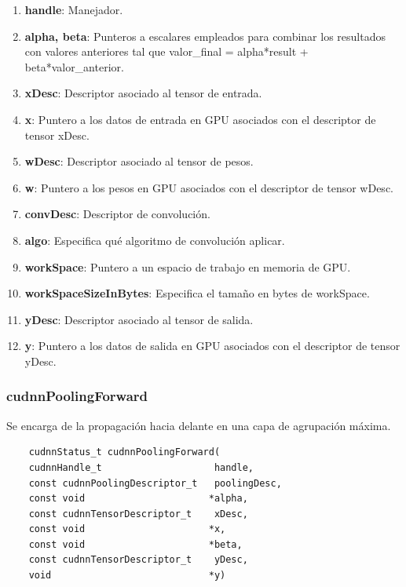 \begin{enumerate}
	\item \textbf{handle}: Manejador.
	\item \textbf{alpha, beta}: Punteros a escalares empleados para combinar los resultados con valores anteriores tal que valor\_final = alpha*result + beta*valor\_anterior.
	\item \textbf{xDesc}: Descriptor asociado al tensor de entrada.
	\item \textbf{x}: Puntero a los datos de entrada en GPU asociados con el descriptor de tensor xDesc.
	\item \textbf{wDesc}: Descriptor asociado al tensor de pesos.
	\item \textbf{w}: Puntero a los pesos en GPU asociados con el descriptor de tensor wDesc.
	\item \textbf{convDesc}: Descriptor de convolución.
	\item \textbf{algo}: Especifica qué algoritmo de convolución aplicar.
	\item \textbf{workSpace}: Puntero a un espacio de trabajo en memoria de GPU.
	\item \textbf{workSpaceSizeInBytes}: Especifica el tamaño en bytes de workSpace.
	\item \textbf{yDesc}: Descriptor asociado al tensor de salida.
	\item \textbf{y}: Puntero a los datos de salida en GPU asociados con el descriptor de tensor yDesc.
\end{enumerate}
\cite{cuDNN_conv_fwd}

\subsubsection{cudnnPoolingForward}
Se encarga de la propagación hacia delante en una capa de agrupación máxima.

\begin{verbatim}
	cudnnStatus_t cudnnPoolingForward(
	cudnnHandle_t                    handle,
	const cudnnPoolingDescriptor_t   poolingDesc,
	const void                      *alpha,
	const cudnnTensorDescriptor_t    xDesc,
	const void                      *x,
	const void                      *beta,
	const cudnnTensorDescriptor_t    yDesc,
	void                            *y)
\end{verbatim}

